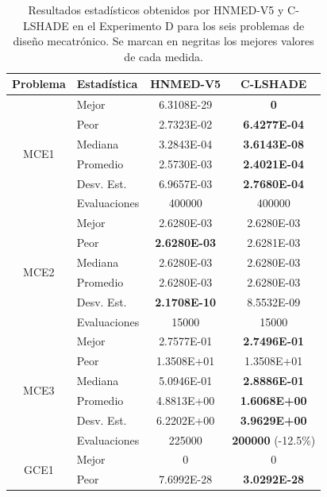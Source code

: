 \begin{table}
	\centering
	\captionsetup{width=.85\linewidth}
	\caption[Resultados estadísticos obtenidos por HNMED-V5 y C-LSHADE
	 en el Experimento D para los seis problemas de diseño mecatrónico.]{Resultados estadísticos obtenidos por HNMED-V5 y C-LSHADE
	 	en el Experimento D para los seis problemas de diseño mecatrónico. Se marcan en negritas los
		mejores valores de cada medida.}\label{tab:Resultados estadísticos obtenidos por HNMED-V5 y el algoritmo C-LSHADE en los seis problemas de diseño mecatrónico}
	\begin{tabular}{clcc} 
		\hline
		Problema              & Estadística   & HNMED-V5 & C-LSHADE  \\ 
		\hline
		\multirow{6}{*}{MCE1} & Mejor        & 6.3108E-29 & \textbf{0 }      \\
		& Peor         &2.7323E-02&  \textbf{6.4277E-04}  \\
		& Mediana      &3.2843E-04&\textbf{3.6143E-08}     \\
		& Promedio     &2.5730E-03& \textbf{ 2.4021E-04 } \\
		& Desv. Est.   &6.9657E-03&\textbf{ 2.7680E-04}\\
		& Evaluaciones &400000   &  400000       \\
		\hline
		\multirow{6}{*}{MCE2} & Mejor        &2.6280E-03&2.6280E-03
		\\
		& Peor         &\textbf{2.6280E-03}&2.6281E-03                \\
		& Mediana      &2.6280E-03&2.6280E-03   \\
		& Promedio     &2.6280E-03&2.6280E-03    \\
		& Desv. Est.   &\textbf{2.1708E-10}&8.5532E-09 \\
		& Evaluaciones &15000&15000                \\
		\hline
		\multirow{6}{*}{MCE3} & Mejor        &2.7577E-01&\textbf{2.7496E-01}  \\
		& Peor         &1.3508E+01&1.3508E+01     \\
		& Mediana      &5.0946E-01&\textbf{2.8886E-01} \\
		& Promedio     &4.8813E+00&\textbf{1.6068E+00}\\
		& Desv. Est.   &6.2202E+00&\textbf{3.9629E+00}\\
		& Evaluaciones &225000& \textbf{200000} (-12.5\%) \\
		\hline
		\multirow{6}{*}{GCE1} & Mejor        &0&0\\
		& Peor         &7.6992E-28&\textbf{3.0292E-28}\\

\end{tabular}
\end{table}
